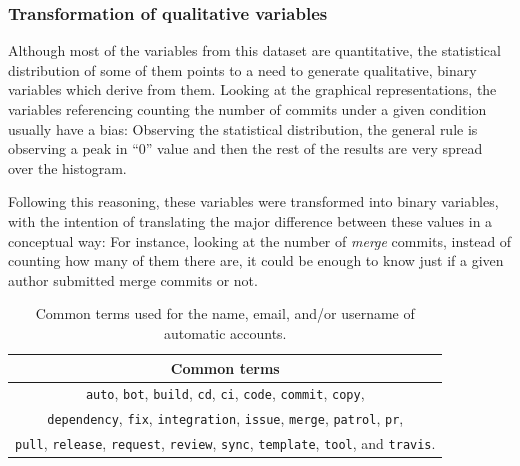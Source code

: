 \documentclass[a4paper, 12pt]{book}
\begin{document}
\subsubsection{Transformation of qualitative variables}
\label{sssec:transformation-qualitative}

Although most of the variables from this dataset are quantitative, the statistical distribution of some of them points to a need to generate 
qualitative, binary variables which derive from them. Looking at the graphical representations, the variables referencing counting the number of commits under a given condition usually have a bias: Observing the statistical distribution, the general rule is observing a peak in ``0'' value and then the rest of the results are very spread over the histogram. 

Following this reasoning, these variables were transformed into binary variables, with the intention of translating the major difference between these values in a conceptual way: For instance, looking at the number of \textit{merge} commits, instead of counting how many of them there are, it could be enough to know just if a given author submitted merge commits or not.

\begin{table}[htb]  %
 \renewcommand{\arraystretch}{1.2}  %
 \begin{center}
  \begin{tabular}{ c }
    \toprule    %
    \textbf{Common terms} \\
    \midrule
    \texttt{auto}, \texttt{bot}, \texttt{build}, \texttt{cd}, \texttt{ci}, \texttt{code}, \texttt{commit}, \texttt{copy},\\
    \texttt{dependency}, \texttt{fix}, \texttt{integration}, \texttt{issue}, \texttt{merge}, \texttt{patrol}, \texttt{pr},\\
    \texttt{pull}, \texttt{release}, \texttt{request}, \texttt{review}, \texttt{sync}, \texttt{template}, \texttt{tool}, and \texttt{travis}. \\
    \bottomrule     %
  \end{tabular}
  \caption{Common terms used for the name, email, and/or username of automatic accounts.}
  \label{table:common-bot-terms}
 \end{center}
\end{table}
\end{document}
